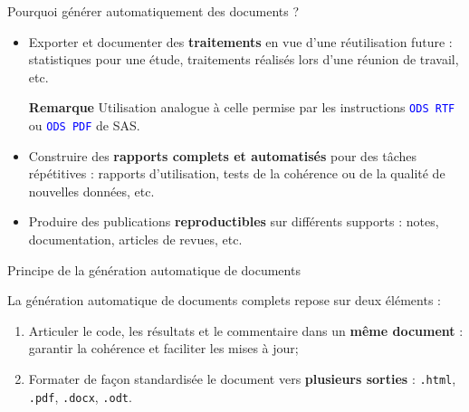 \documentclass[12pt,handout,ignorenonframetext,]{beamer}
\providecommand{\tightlist}{%
  \setlength{\itemsep}{0pt}\setlength{\parskip}{0pt}}
\begin{document}
\begin{frame}{\large Pourquoi générer automatiquement des documents ?}

\begin{itemize}
\item
  Exporter et documenter des \textbf{traitements} en vue d'une
  réutilisation future : statistiques pour une étude, traitements
  réalisés lors d'une réunion de travail, etc.

  \vspace{0.2cm} \small  \textbf{Remarque} Utilisation analogue à celle
  permise par les instructions \textcolor{blue}{\texttt{ODS RTF}} ou
  \textcolor{blue}{\texttt{ODS PDF}} de SAS.
\end{itemize}

\pause \normalsize 

\begin{itemize}
\tightlist
\item
  Construire des \textbf{rapports complets et automatisés} pour des
  tâches répétitives : rapports d'utilisation, tests de la cohérence ou
  de la qualité de nouvelles données, etc.
\end{itemize}

\pause \vspace{0.2cm}

\begin{itemize}
\tightlist
\item
  Produire des publications \textbf{reproductibles} sur différents
  supports : notes, documentation, articles de revues, etc.
\end{itemize}

\end{frame}

\begin{frame}[fragile]{\large Principe de la génération automatique de
documents}

La génération automatique de documents complets repose sur deux éléments
:

\begin{enumerate}
\def\labelenumi{\arabic{enumi}.}
\item
  Articuler le code, les résultats et le commentaire dans un
  \textbf{même document} : garantir la cohérence et faciliter les mises
  à jour;
\item
  Formater de façon standardisée le document vers \textbf{plusieurs
  sorties} : \texttt{.html}, \texttt{.pdf}, \texttt{.docx},
  \texttt{.odt}.
\end{enumerate}

\pause \small \centering


\end{frame}
\end{document}
